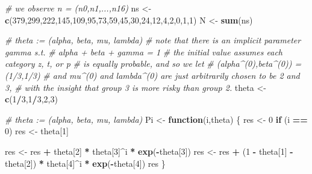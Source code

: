 \documentclass[
]{article}
\newenvironment{Shaded}{\begin{snugshade}}{\end{snugshade}}
\newcommand{\CommentTok}[1]{\textcolor[rgb]{0.56,0.35,0.01}{\textit{#1}}}
\newcommand{\ControlFlowTok}[1]{\textcolor[rgb]{0.13,0.29,0.53}{\textbf{#1}}}
\newcommand{\DecValTok}[1]{\textcolor[rgb]{0.00,0.00,0.81}{#1}}
\newcommand{\FunctionTok}[1]{\textcolor[rgb]{0.13,0.29,0.53}{\textbf{#1}}}
\newcommand{\NormalTok}[1]{#1}
\newcommand{\OtherTok}[1]{\textcolor[rgb]{0.56,0.35,0.01}{#1}}
\newcommand{\SpecialCharTok}[1]{\textcolor[rgb]{0.81,0.36,0.00}{\textbf{#1}}}
\begin{document}
\begin{Shaded}
\begin{Highlighting}[]
\CommentTok{\# we observe n = (n0,n1,...,n16)}
\NormalTok{ns }\OtherTok{\textless{}{-}} \FunctionTok{c}\NormalTok{(}\DecValTok{379}\NormalTok{,}\DecValTok{299}\NormalTok{,}\DecValTok{222}\NormalTok{,}\DecValTok{145}\NormalTok{,}\DecValTok{109}\NormalTok{,}\DecValTok{95}\NormalTok{,}\DecValTok{73}\NormalTok{,}\DecValTok{59}\NormalTok{,}\DecValTok{45}\NormalTok{,}\DecValTok{30}\NormalTok{,}\DecValTok{24}\NormalTok{,}\DecValTok{12}\NormalTok{,}\DecValTok{4}\NormalTok{,}\DecValTok{2}\NormalTok{,}\DecValTok{0}\NormalTok{,}\DecValTok{1}\NormalTok{,}\DecValTok{1}\NormalTok{)}
\NormalTok{N }\OtherTok{\textless{}{-}} \FunctionTok{sum}\NormalTok{(ns)}

\CommentTok{\# theta := (alpha, beta, mu, lambda)\textquotesingle{}}
\CommentTok{\# note that there is an implicit parameter gamma s.t.}
\CommentTok{\# alpha + beta + gamma = 1}
\CommentTok{\# the initial value assumes each category z, t, or p}
\CommentTok{\# is equally probable, and so we let}
\CommentTok{\#     (alpha\^{}(0),beta\^{}(0)) = (1/3,1/3)}
\CommentTok{\# and mu\^{}(0) and lambda\^{}(0) are just arbitrarily chosen to be 2 and 3,}
\CommentTok{\# with the insight that group 3 is more risky than group 2.}
\NormalTok{theta }\OtherTok{\textless{}{-}} \FunctionTok{c}\NormalTok{(}\DecValTok{1}\SpecialCharTok{/}\DecValTok{3}\NormalTok{,}\DecValTok{1}\SpecialCharTok{/}\DecValTok{3}\NormalTok{,}\DecValTok{2}\NormalTok{,}\DecValTok{3}\NormalTok{)}

\CommentTok{\# theta := (alpha, beta, mu, lambda)}
\NormalTok{Pi }\OtherTok{\textless{}{-}} \ControlFlowTok{function}\NormalTok{(i,theta)}
\NormalTok{\{}
\NormalTok{  res }\OtherTok{\textless{}{-}} \DecValTok{0}
  \ControlFlowTok{if}\NormalTok{ (i }\SpecialCharTok{==} \DecValTok{0}\NormalTok{)}
\NormalTok{    res }\OtherTok{\textless{}{-}}\NormalTok{ theta[}\DecValTok{1}\NormalTok{]}
  
\NormalTok{  res }\OtherTok{\textless{}{-}}\NormalTok{ res }\SpecialCharTok{+}\NormalTok{ theta[}\DecValTok{2}\NormalTok{] }\SpecialCharTok{*}\NormalTok{ theta[}\DecValTok{3}\NormalTok{]}\SpecialCharTok{\^{}}\NormalTok{i }\SpecialCharTok{*} \FunctionTok{exp}\NormalTok{(}\SpecialCharTok{{-}}\NormalTok{theta[}\DecValTok{3}\NormalTok{])}
\NormalTok{  res }\OtherTok{\textless{}{-}}\NormalTok{ res }\SpecialCharTok{+}\NormalTok{ (}\DecValTok{1} \SpecialCharTok{{-}}\NormalTok{ theta[}\DecValTok{1}\NormalTok{] }\SpecialCharTok{{-}}\NormalTok{ theta[}\DecValTok{2}\NormalTok{]) }\SpecialCharTok{*}\NormalTok{ theta[}\DecValTok{4}\NormalTok{]}\SpecialCharTok{\^{}}\NormalTok{i }\SpecialCharTok{*} \FunctionTok{exp}\NormalTok{(}\SpecialCharTok{{-}}\NormalTok{theta[}\DecValTok{4}\NormalTok{])}
\NormalTok{  res}
\NormalTok{\}}


\end{Highlighting}
\end{Shaded}
\end{document}

